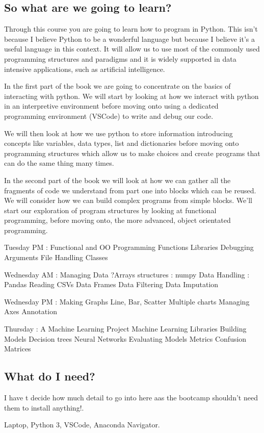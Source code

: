 \subsection{So what are we going to learn?}

Through this course you are going to learn how to program in Python. This isn't because I believe Python to be a wonderful language but because I believe it's a useful language in this context. It will allow us to use most of the commonly used programming structures and paradigms and it is widely supported in data intensive applications, such as artificial intelligence.

In the first part of the book we are going to concentrate on the basics of interacting with python. We will start by looking at how we interact with python in an interpretive environment before moving onto using a dedicated programming environment (VSCode) to write and debug our code.

We will then look at how we use python to store information introducing concepts like variables, data types, list and dictionaries before moving onto programming structures which allow us to make choices and create programs that can do the same thing many times.

In the second part of the book we will look at how we can gather all the fragments of code we understand from part one into blocks which can be reused. We will consider how we can build complex programs from simple blocks.  We'll start our exploration of program structures by looking at functional programming, before moving onto, the more advanced, object orientated programming. 


Tuesday PM : Functional and OO Programming
Functions
Libraries
Debugging
Arguments
File Handling
Classes

Wednesday AM : Managing Data
?Arrays structures : numpy
Data Handling : Pandas
Reading CSVs
Data Frames
Data Filtering
Data Imputation

Wednesday PM : Making Graphs 
Line, Bar, Scatter
Multiple charts
Managing Axes
Annotation

Thursday : A Machine Learning Project
Machine Learning Libraries
Building Models
Decision trees
Neural Networks
Evaluating Models
Metrics
Confusion Matrices

\fi


\subsection{What do I need?}


I have t decide how much detail to go into here aas the bootcamp shouldn't need them to install anything!.


Laptop, Python 3, VSCode, Anaconda Navigator.
